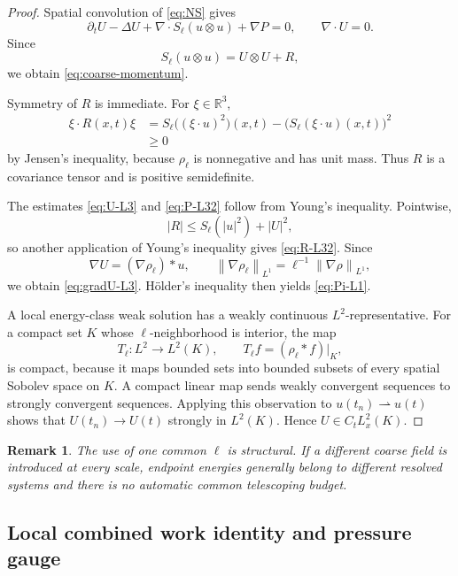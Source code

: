 \documentclass[11pt]{article}
\numberwithin{equation}{section}
\newtheorem{remark}[theorem]{Remark}
\newcommand{\R}{\mathbb R}
\newcommand{\norm}[2]{\left\lVert #1\right\rVert_{#2}}
\begin{document}
\begin{proof}
Spatial convolution of \eqref{eq:NS} gives
\[
\partial_tU-\Delta U+\nabla\cdot S_\ell(u\otimes u)+\nabla P=0,
\qquad
\nabla\cdot U=0.
\]
Since
\[
S_\ell(u\otimes u)=U\otimes U+R,
\]
we obtain \eqref{eq:coarse-momentum}.

Symmetry of \(R\) is immediate. For \(\xi\in\R^3\),
\begin{align*}
\xi\cdot R(x,t)\xi
&=
S_\ell\bigl((\xi\cdot u)^2\bigr)(x,t)
-
\bigl(S_\ell(\xi\cdot u)(x,t)\bigr)^2
\\
&\ge0
\end{align*}
by Jensen's inequality, because \(\rho_\ell\) is nonnegative and has unit mass. Thus \(R\) is a covariance tensor and is positive semidefinite.

The estimates \eqref{eq:U-L3} and \eqref{eq:P-L32} follow from Young's inequality. Pointwise,
\[
|R|
\le
S_\ell(|u|^2)+|U|^2,
\]
so another application of Young's inequality gives \eqref{eq:R-L32}. Since
\[
\nabla U=(\nabla\rho_\ell)*u,
\qquad
\norm{\nabla\rho_\ell}{L^1}
=\ell^{-1}\norm{\nabla\rho}{L^1},
\]
we obtain \eqref{eq:gradU-L3}. H\"older's inequality then yields \eqref{eq:Pi-L1}.

A local energy-class weak solution has a weakly continuous \(L^2\)-representative. For a compact set \(K\) whose \(\ell\)-neighborhood is interior, the map
\[
T_\ell:L^2\longrightarrow L^2(K),
\qquad
T_\ell f=(\rho_\ell*f)|_K,
\]
is compact, because it maps bounded sets into bounded subsets of every spatial Sobolev space on \(K\). A compact linear map sends weakly convergent sequences to strongly convergent sequences. Applying this observation to \(u(t_n)\rightharpoonup u(t)\) shows that \(U(t_n)\to U(t)\) strongly in \(L^2(K)\). Hence \(U\in C_tL^2_x(K)\).
\end{proof}

\begin{remark}
The use of one common \(\ell\) is structural. If a different coarse field is introduced at every scale, endpoint energies generally belong to different resolved systems and there is no automatic common telescoping budget.
\end{remark}

\subsection{Local combined work identity and pressure gauge}\label{sec:identity}
\end{document}
